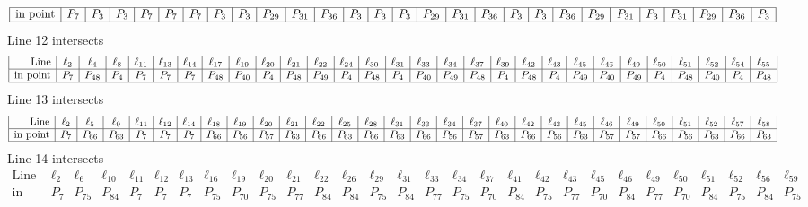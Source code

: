 \documentclass{article}
\begin{document}
{$$\begin{array}{|r*{27}{|c}|}
\hline
\mbox{in point}  & P_{7} & P_{3} & P_{3} & P_{7} & P_{7} & P_{7} & P_{3} & P_{3} & P_{29} & P_{31} & P_{36} & P_{3} & P_{3} & P_{3} & P_{29} & P_{31} & P_{36} & P_{3} & P_{3} & P_{36} & P_{29} & P_{31} & P_{3} & P_{31} & P_{29} & P_{36} & P_{3}\\
\hline
\end{array}
$$
Line 12 intersects 
$$
\begin{array}{|r*{28}{|c}|}
\hline
\mbox{Line}  & \ell_{2} & \ell_{4} & \ell_{8} & \ell_{11} & \ell_{13} & \ell_{14} & \ell_{17} & \ell_{19} & \ell_{20} & \ell_{21} & \ell_{22} & \ell_{24} & \ell_{30} & \ell_{31} & \ell_{33} & \ell_{34} & \ell_{37} & \ell_{39} & \ell_{42} & \ell_{43} & \ell_{45} & \ell_{46} & \ell_{49} & \ell_{50} & \ell_{51} & \ell_{52} & \ell_{54} & \ell_{55}\\
\hline
\mbox{in point}  & P_{7} & P_{48} & P_{4} & P_{7} & P_{7} & P_{7} & P_{48} & P_{40} & P_{4} & P_{48} & P_{49} & P_{4} & P_{48} & P_{4} & P_{40} & P_{49} & P_{48} & P_{4} & P_{48} & P_{4} & P_{49} & P_{40} & P_{49} & P_{4} & P_{48} & P_{40} & P_{4} & P_{48}\\
\hline
\end{array}
$$
Line 13 intersects 
$$
\begin{array}{|r*{28}{|c}|}
\hline
\mbox{Line}  & \ell_{2} & \ell_{5} & \ell_{9} & \ell_{11} & \ell_{12} & \ell_{14} & \ell_{18} & \ell_{19} & \ell_{20} & \ell_{21} & \ell_{22} & \ell_{25} & \ell_{28} & \ell_{31} & \ell_{33} & \ell_{34} & \ell_{37} & \ell_{40} & \ell_{42} & \ell_{43} & \ell_{45} & \ell_{46} & \ell_{49} & \ell_{50} & \ell_{51} & \ell_{52} & \ell_{57} & \ell_{58}\\
\hline
\mbox{in point}  & P_{7} & P_{66} & P_{63} & P_{7} & P_{7} & P_{7} & P_{66} & P_{56} & P_{57} & P_{63} & P_{66} & P_{63} & P_{66} & P_{63} & P_{66} & P_{56} & P_{57} & P_{63} & P_{66} & P_{56} & P_{63} & P_{57} & P_{57} & P_{66} & P_{56} & P_{63} & P_{66} & P_{63}\\
\hline
\end{array}
$$
Line 14 intersects 
$$
\begin{array}{|r*{28}{|c}|}
\hline
\mbox{Line}  & \ell_{2} & \ell_{6} & \ell_{10} & \ell_{11} & \ell_{12} & \ell_{13} & \ell_{16} & \ell_{19} & \ell_{20} & \ell_{21} & \ell_{22} & \ell_{26} & \ell_{29} & \ell_{31} & \ell_{33} & \ell_{34} & \ell_{37} & \ell_{41} & \ell_{42} & \ell_{43} & \ell_{45} & \ell_{46} & \ell_{49} & \ell_{50} & \ell_{51} & \ell_{52} & \ell_{56} & \ell_{59}\\
\hline
\mbox{in point}  & P_{7} & P_{75} & P_{84} & P_{7} & P_{7} & P_{7} & P_{75} & P_{70} & P_{75} & P_{77} & P_{84} & P_{84} & P_{75} & P_{84} & P_{77} & P_{75} & P_{70} & P_{84} & P_{75} & P_{77} & P_{70} & P_{84} & P_{77} & P_{70} & P_{84} & P_{75} & P_{84} & P_{75}\\

\end{array}$$}
\end{document}
